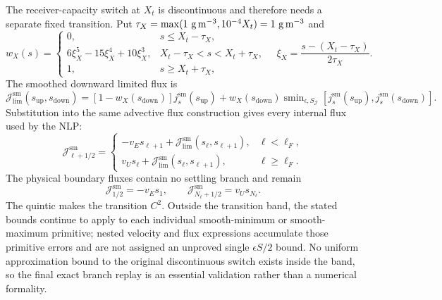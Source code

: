 \documentclass[a4paper,fleqn]{cas-sc}
\begin{document}
The receiver-capacity switch at $X_t$ is discontinuous and therefore needs a separate fixed transition. Put $\tau_X=\max(1\ {\rm g\,m^{-3}},10^{-4}X_t)=1\ {\rm g\,m^{-3}}$ and
\begin{equation}
\label{eq:receiver_transition}
w_X(s)=
\begin{cases}
0,&s\leq X_t-\tau_X,\\
6\xi_X^5-15\xi_X^4+10\xi_X^3,&X_t-\tau_X<s<X_t+\tau_X,\\
1,&s\geq X_t+\tau_X,
\end{cases}
\quad
\xi_X=\frac{s-(X_t-\tau_X)}{2\tau_X}.
\end{equation}
The smoothed downward limited flux is
\begin{equation}
\label{eq:smooth_receiver_flux}
\mathcal J_{\mathrm{lim}}^{\mathrm{sm}}(s_{\mathrm{up}},s_{\mathrm{down}})
=
[1-w_X(s_{\mathrm{down}})]j_s^{\mathrm{sm}}(s_{\mathrm{up}})
+w_X(s_{\mathrm{down}})
\operatorname{smin}_{\epsilon,S_{\mathcal J}}
\!\left[j_s^{\mathrm{sm}}(s_{\mathrm{up}}),j_s^{\mathrm{sm}}(s_{\mathrm{down}})\right].
\end{equation}
Substitution into the same advective flux construction gives every internal flux used by the NLP:
\begin{equation}
\label{eq:smooth_total_flux}
\mathcal J_{\ell+1/2}^{\mathrm{sm}}=
\begin{cases}
-v_Es_{\ell+1}
+\mathcal J_{\mathrm{lim}}^{\mathrm{sm}}(s_\ell,s_{\ell+1}),
&\ell<\ell_F,\\
v_Us_\ell
+\mathcal J_{\mathrm{lim}}^{\mathrm{sm}}(s_\ell,s_{\ell+1}),
&\ell\geq\ell_F.
\end{cases}
\end{equation}
The physical boundary fluxes contain no settling branch and remain
\begin{equation}
\mathcal J_{1/2}^{\mathrm{sm}}=-v_Es_1,\qquad
\mathcal J_{N_\ell+1/2}^{\mathrm{sm}}=v_Us_{N_\ell}.
\end{equation}
The quintic makes the transition $C^2$. Outside the transition band, the stated bounds continue to apply to each individual smooth-minimum or smooth-maximum primitive; nested velocity and flux expressions accumulate those primitive errors and are not assigned an unproved single $\epsilon S/2$ bound. No uniform approximation bound to the original discontinuous switch exists inside the band, so the final exact branch replay is an essential validation rather than a numerical formality.
\end{document}

